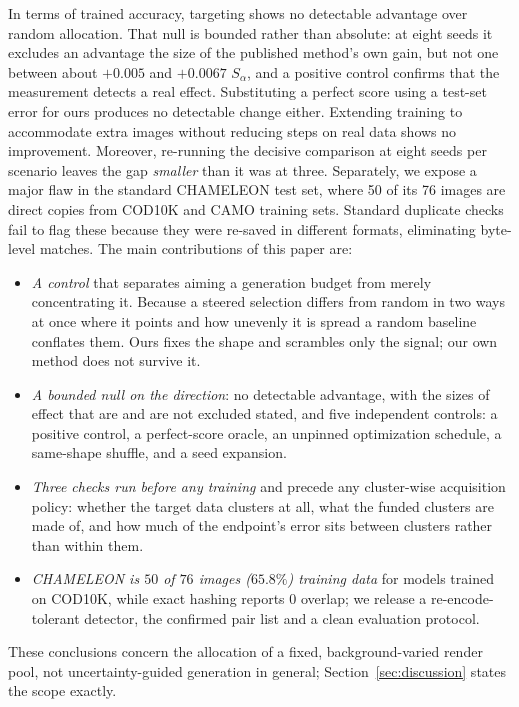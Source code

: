 \documentclass{article}
\begin{document}
In terms of trained accuracy, targeting shows no detectable advantage over random allocation. That null is
bounded rather than absolute: at eight seeds it excludes an advantage the size of the published method's own gain,
but not one between about $+0.005$ and $+0.0067$ $S_\alpha$, and a positive control confirms that the measurement
detects a real effect.
Substituting a perfect score using a test-set error for ours produces no detectable change either. Extending training to accommodate extra images without reducing steps on real data shows no improvement. Moreover, re-running the decisive comparison at eight
seeds per scenario leaves the gap \emph{smaller} than it was at three. Separately, we expose a major flaw in the standard CHAMELEON test set, where 50 of its 76 images are direct copies from COD10K and CAMO training sets. Standard duplicate checks fail to flag these because they were re-saved in different formats, eliminating byte-level matches. The main contributions of this paper are:

\begin{itemize}
\item \textit{A control} that separates aiming a generation budget from merely concentrating it. Because a steered selection differs from random in two ways at once where it points and how unevenly it is spread a random baseline conflates them. Ours fixes the shape and scrambles only the signal; our own method does not survive it.
\item \textit{A bounded null on the direction}: no detectable advantage, with the sizes of effect that are and are
not excluded stated, and five independent controls: a positive control, a perfect-score oracle, an unpinned
optimization schedule, a same-shape shuffle, and a seed expansion.
\item \textit{Three checks run before any training} and precede any cluster-wise acquisition
policy: whether the target data clusters at all, what the funded clusters are made of, and how much of the endpoint's error sits between clusters rather than within them.
\item \textit{CHAMELEON is $50$ of $76$ images ($65.8\%$) training data} for models trained on
COD10K, while exact hashing reports $0$ overlap; we release a re-encode-tolerant detector, the
confirmed pair list and a clean evaluation protocol.
\end{itemize}
These conclusions concern the allocation of a fixed, background-varied render pool, not uncertainty-guided generation
in general; Section~\ref{sec:discussion} states the scope exactly.
\end{document}

